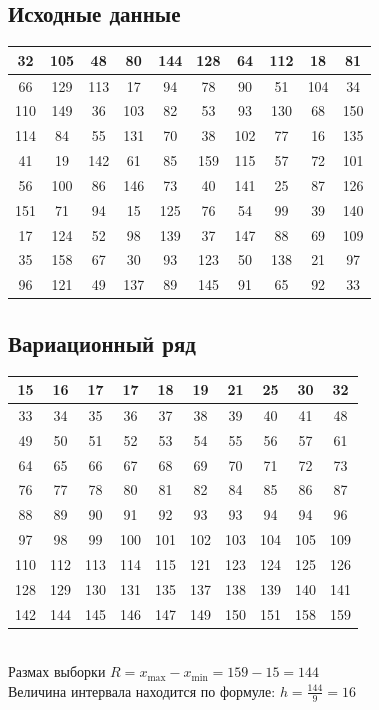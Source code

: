 \documentclass[12pt,a4paper]{report}
\begin{document}
\subsection*{Исходные данные}
\begin{tabular}{|c|c|c|c|c|c|c|c|c|c|}
	\hline
	32  & 105 & 48  & 80  & 144 & 128 & 64  & 112 & 18  & 81  \\
	\hline
	66  & 129 & 113 & 17  & 94  & 78  & 90  & 51  & 104 & 34  \\
	\hline
	110 & 149 & 36  & 103 & 82  & 53  & 93  & 130 & 68  & 150 \\
	\hline
	114 & 84  & 55  & 131 & 70  & 38  & 102 & 77  & 16  & 135 \\
	\hline
	41  & 19  & 142 & 61  & 85  & 159 & 115 & 57  & 72  & 101 \\
	\hline
	56  & 100 & 86  & 146 & 73  & 40  & 141 & 25  & 87  & 126 \\
	\hline
	151 & 71  & 94  & 15  & 125 & 76  & 54  & 99  & 39  & 140 \\
	\hline
	17  & 124 & 52  & 98  & 139 & 37  & 147 & 88  & 69  & 109 \\
	\hline
	35  & 158 & 67  & 30  & 93  & 123 & 50  & 138 & 21  & 97  \\
	\hline
	96  & 121 & 49  & 137 & 89  & 145 & 91  & 65  & 92  & 33  \\
	\hline
\end{tabular}
\subsection*{Вариационный ряд}
\begin{tabular}{|c|c|c|c|c|c|c|c|c|c|}
	\hline
	15  & 16  & 17  & 17  & 18  & 19  & 21  & 25  & 30  & 32  \\
	\hline
	33  & 34  & 35  & 36  & 37  & 38  & 39  & 40  & 41  & 48  \\
	\hline
	49  & 50  & 51  & 52  & 53  & 54  & 55  & 56  & 57  & 61  \\
	\hline
	64  & 65  & 66  & 67  & 68  & 69  & 70  & 71  & 72  & 73  \\
	\hline
	76  & 77  & 78  & 80  & 81  & 82  & 84  & 85  & 86  & 87  \\
	\hline
	88  & 89  & 90  & 91  & 92  & 93  & 93  & 94  & 94  & 96  \\
	\hline
	97  & 98  & 99  & 100 & 101 & 102 & 103 & 104 & 105 & 109 \\
	\hline
	110 & 112 & 113 & 114 & 115 & 121 & 123 & 124 & 125 & 126 \\
	\hline
	128 & 129 & 130 & 131 & 135 & 137 & 138 & 139 & 140 & 141 \\
	\hline
	142 & 144 & 145 & 146 & 147 & 149 & 150 & 151 & 158 & 159 \\
	\hline
\end{tabular}\\
\hfill\break
Размах выборки $R=x_{\max}-x_{\min}=159-15=144$ \\
Величина интервала находится по формуле: $h=\frac{144}{9}=16$ \\
\end{document}
